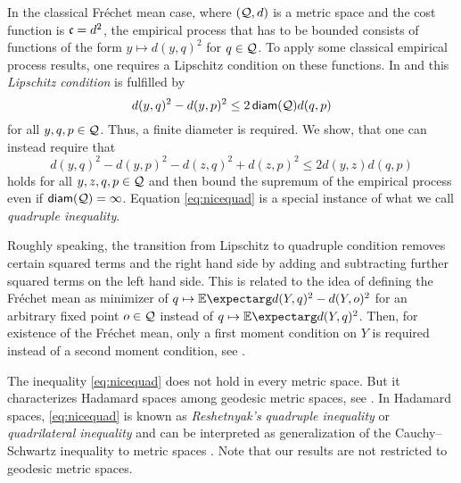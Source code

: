 In the classical Fréchet mean case, where $(\mathcal{Q}, d)$ is a metric space and the cost function is $\mathfrak{c} = d^2$, the empirical process that has to be bounded consists of functions of the form $y \mapsto d(y,q)^2$ for $q\in\mathcal{Q}$. To apply some classical empirical process results, one requires a Lipschitz condition on these functions. In \cite{petersen16} and \cite{legouic18} this \textit{Lipschitz condition} is fulfilled by
\begin{equation}\label{eq:lipbound}
	d(y,q)^2 - d(y,p)^2 \leq  2 \operatorname{\mathsf{diam}}(\mathcal{Q}) d(q, p)
\end{equation}
for all $y,q, p \in \mathcal{Q}$. Thus, a finite diameter is required. We show, that one can instead require that 
\begin{equation}\label{eq:nicequad}
	d(y,q)^2 - d(y,p)^2 - d(z,q)^2 + d(z,p)^2 \leq  2 d(y, z) d(q, p)
\end{equation}
holds for all $y,z,q, p \in \mathcal{Q}$ and then bound the supremum of the empirical process even if $\operatorname{\mathsf{diam}}(\mathcal{Q}) = \infty$. Equation \eqref{eq:nicequad} is a special instance of what we call \textit{quadruple inequality}.

Roughly speaking, the transition from Lipschitz to quadruple condition removes certain squared terms and the right hand side by adding and subtracting further squared terms on the left hand side. This is related to the idea of defining the Fréchet mean as minimizer of $q \mapsto \Ex{d(Y, q)^2 - d(Y, o)^2}$ for an arbitrary fixed point $o\in\mathcal{Q}$ instead of $q \mapsto \Ex{d(Y, q)^2}$. Then, for existence of the Fréchet mean, only a first moment condition on $Y$ is required instead of a second moment condition, see \cite[Acknowledgement to Lutz Mattner]{sturm03}. 

The inequality \eqref{eq:nicequad} does not hold in every metric space. But it characterizes Hadamard spaces among geodesic metric spaces, see \cite{berg08}. In Hadamard spaces, \eqref{eq:nicequad} is known as \textit{Reshetnyak’s quadruple inequality} \cite{sturm03} or \textit{quadrilateral inequality} \cite{berg08} and can be interpreted as generalization  of the Cauchy--Schwartz inequality to metric spaces \cite{berg08}. Note that our results are not restricted to geodesic metric spaces.

